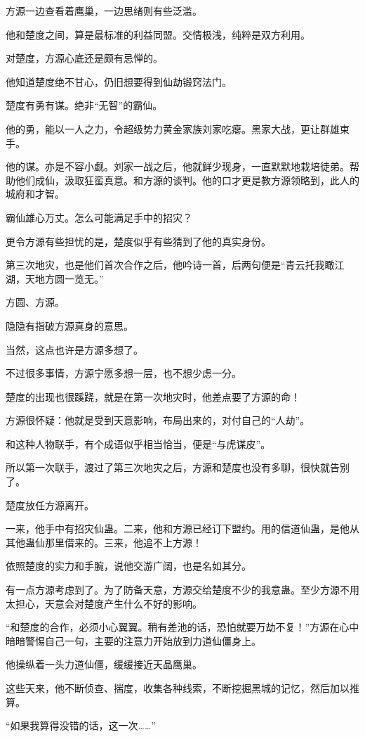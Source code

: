 \begin{this_body}
方源一边查看着鹰巢，一边思绪则有些泛滥。

他和楚度之间，算是最标准的利益同盟。交情极浅，纯粹是双方利用。

对楚度，方源心底还是颇有忌惮的。

他知道楚度绝不甘心，仍旧想要得到仙劫锻窍法门。

楚度有勇有谋。绝非“无智”的霸仙。

他的勇，能以一人之力，令超级势力黄金家族刘家吃瘪。黑家大战，更让群雄束手。

他的谋。亦是不容小觑。刘家一战之后，他就鲜少现身，一直默默地栽培徒弟。帮助他们成仙，汲取狂蛮真意。和方源的谈判。他的口才更是教方源领略到，此人的城府和才智。

霸仙雄心万丈。怎么可能满足手中的招灾？

更令方源有些担忧的是，楚度似乎有些猜到了他的真实身份。

第三次地灾，也是他们首次合作之后，他吟诗一首，后两句便是“青云托我瞰江湖，天地方圆一览无。”

方圆、方源。

隐隐有指破方源真身的意思。

当然，这点也许是方源多想了。

不过很多事情，方源宁愿多想一层，也不想少虑一分。

楚度的出现也很蹊跷，就是在第一次地灾时，他差点要了方源的命！

方源很怀疑：他就是受到天意影响，布局出来的，对付自己的“人劫”。

和这种人物联手，有个成语似乎相当恰当，便是“与虎谋皮”。

所以第一次联手，渡过了第三次地灾之后，方源和楚度也没有多聊，很快就告别了。

楚度放任方源离开。

一来，他手中有招灾仙蛊。二来，他和方源已经订下盟约。用的信道仙蛊，是他从其他蛊仙那里借来的。三来，他追不上方源！

依照楚度的实力和手腕，说他交游广阔，也是名如其分。

有一点方源考虑到了。为了防备天意，方源交给楚度不少的我意蛊。至少方源不用太担心，天意会对楚度产生什么不好的影响。

“和楚度的合作，必须小心翼翼。稍有差池的话，恐怕就要万劫不复！”方源在心中暗暗警惕自己一句，主要的注意力开始放到力道仙僵身上。

他操纵着一头力道仙僵，缓缓接近天晶鹰巢。

这些天来，他不断侦查、揣度，收集各种线索，不断挖掘黑城的记忆，然后加以推算。

“如果我算得没错的话，这一次……”


\end{this_body}
